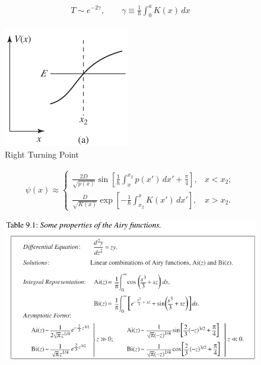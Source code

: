 \begin{align}
	T \sim e^{-2 \gamma}, \qquad \gamma \equiv \frac{1}{\hbar} \int_0^a K(x)\, dx
\end{align}
\newpage
\begin{figure}[h]
	\centering
	\includegraphics[width=0.3\linewidth]{./figures/right-turning-point.pdf}
	\caption{Right Turning Point}
	\label{fig:right-turning-point}
\end{figure}
\begin{align}
	\psi(x) \approx \begin{cases}
		\frac{2D}{\sqrt{p(x)}} \sin{\left[ \frac{1}{\hbar} \int_{x}^{x_2} p(x')\, dx' + \frac{\pi}{4}\right]}, & x<x_2 ; \\
		\frac{D}{\sqrt{K(x)}} \exp{\left[- \frac{1}{\hbar} \int_{x_2}^x K(x')\, dx' \right]}, & x>x_2.
	\end{cases}
\end{align}
\begin{figure}[h]
	\includegraphics[width=1\linewidth]{./figures/airy-properties.pdf}
	\label{fig:Airy properties}
\end{figure}
